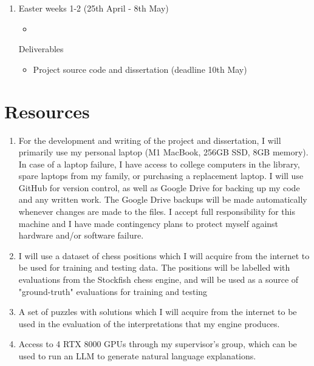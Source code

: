 \documentclass[12pt,a4paper]{article}
\begin{document}
\begin{enumerate}
    \item Easter weeks 1-2 (25th April - 8th May)
    \begin{itemize}
        \item 
    \end{itemize}
    Deliverables
    \begin{itemize}
        \item Project source code and dissertation (deadline 10th May)
    \end{itemize}

\end{enumerate}

\section*{Resources}
\begin{enumerate}
    \item For the development and writing of the project and dissertation, I will primarily use my personal laptop (M1 MacBook, 256GB SSD, 8GB memory). In case of a laptop failure, I have access to college computers in the library, spare laptops from my family, or purchasing a replacement laptop. I will use GitHub for version control, as well as Google Drive for backing up my code and any written work. The Google Drive backups will be made automatically whenever changes are made to the files. I accept full responsibility for this machine and I have made contingency plans to protect myself against hardware and/or software failure.
    \item I will use a dataset of chess positions which I will acquire from the internet to be used for training and testing data. The positions will be labelled with evaluations from the Stockfish chess engine, and will be used as a source of "ground-truth" evaluations for training and testing
    \item A set of puzzles with solutions which I will acquire from the internet to be used in the evaluation of the interpretations that my engine produces.
    \item Access to 4 RTX 8000 GPUs through my supervisor's group, which can be used to run an LLM to generate natural language explanations.
\end{enumerate}
% 
% 
\end{document}
